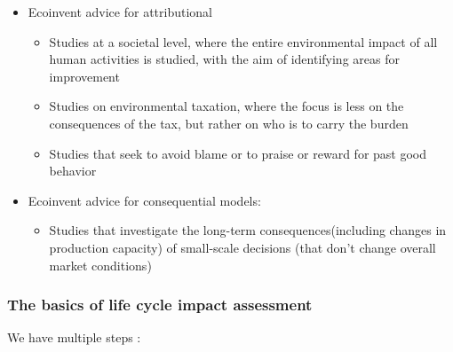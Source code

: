 \begin{itemize}
\tightlist
\item
  Ecoinvent advice for attributional

  \begin{itemize}
  \tightlist
  \item
    Studies at a societal level, where the entire environmental impact
    of all human activities is studied, with the aim of identifying
    areas for improvement
  \item
    Studies on environmental taxation, where the focus is less on the
    consequences of the tax, but rather on who is to carry the burden
  \item
    Studies that seek to avoid blame or to praise or reward for past
    good behavior
  \end{itemize}
\item
  Ecoinvent advice for consequential models:

  \begin{itemize}
  \tightlist
  \item
    Studies that investigate the long-term consequences(including
    changes in production capacity) of small-scale decisions (that don't
    change overall market conditions)
  \end{itemize}
\end{itemize}

\hypertarget{the-basics-of-life-cycle-impact-assessment}{%
\subsubsection{The basics of life cycle impact
assessment}\label{the-basics-of-life-cycle-impact-assessment}}

We have multiple steps :

